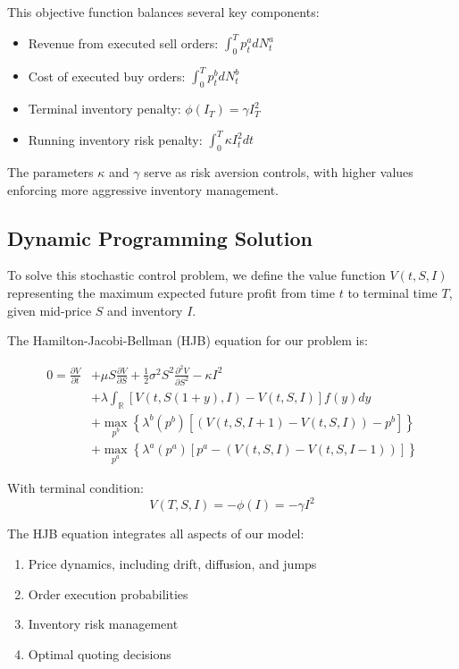 \documentclass[onecolumn,ieee]{arithmaxresearch}
\begin{document}
This objective function balances several key components:
\begin{itemize}
    \item Revenue from executed sell orders: $\int_0^T p^a_t dN^a_t$
    \item Cost of executed buy orders: $\int_0^T p^b_t dN^b_t$
    \item Terminal inventory penalty: $\phi(I_T) = \gamma I_T^2$
    \item Running inventory risk penalty: $\int_0^T \kappa I_t^2 dt$
\end{itemize}

The parameters $\kappa$ and $\gamma$ serve as risk aversion controls, with higher values enforcing more aggressive inventory management.

\subsection{Dynamic Programming Solution}

To solve this stochastic control problem, we define the value function $V(t, S, I)$ representing the maximum expected future profit from time $t$ to terminal time $T$, given mid-price $S$ and inventory $I$.

The Hamilton-Jacobi-Bellman (HJB) equation for our problem is:

\begin{equation}
\begin{aligned}
0 = \frac{\partial V}{\partial t} &+ \mu S \frac{\partial V}{\partial S} + \frac{1}{2}\sigma^2 S^2 \frac{\partial^2 V}{\partial S^2} - \kappa I^2 \\
&+ \lambda \int_{\mathbb{R}} \left[V(t, S(1+y), I) - V(t, S, I)\right] f(y) dy \\
&+ \max_{p^b} \left\{\lambda^b(p^b) \left[(V(t,S,I+1) - V(t,S,I)) - p^b\right]\right\} \\
&+ \max_{p^a} \left\{\lambda^a(p^a) \left[p^a - (V(t,S,I) - V(t,S,I-1))\right]\right\}
\end{aligned}
\end{equation}

With terminal condition:
\begin{equation}
V(T,S,I) = -\phi(I) = -\gamma I^2
\end{equation}

The HJB equation integrates all aspects of our model:
\begin{enumerate}
    \item Price dynamics, including drift, diffusion, and jumps
    \item Order execution probabilities
    \item Inventory risk management
    \item Optimal quoting decisions
\end{enumerate}
\end{document}
